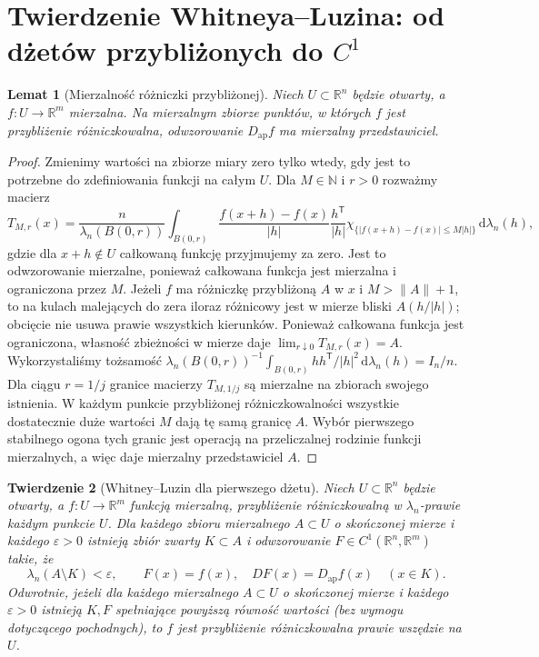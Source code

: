 \documentclass[11pt,a4paper,oneside]{book}
\numberwithin{equation}{chapter}
\theoremstyle{plain}
\newtheorem{twierdzenie}{Twierdzenie}[chapter]
\newtheorem{lemat}[twierdzenie]{Lemat}
\theoremstyle{definition}
\theoremstyle{remark}
\begin{document}
\section{Twierdzenie Whitneya--Luzina: od dżetów przybliżonych do $C^1$}
\begin{lemat}[Mierzalność różniczki przybliżonej]
\label{lem:dzety-ap-meas}
Niech $U\subset\mathbb R^n$ będzie otwarty,
a $f:U\to\mathbb R^m$ mierzalna. Na mierzalnym
zbiorze punktów, w których $f$ jest przybliżenie
różniczkowalna, odwzorowanie $D_{\mathrm{ap}}f$
ma mierzalny przedstawiciel.
\end{lemat}
\begin{proof}
Zmienimy wartości na zbiorze miary zero tylko wtedy,
gdy jest to potrzebne do zdefiniowania funkcji na całym $U$.
Dla $M\in\mathbb N$ i $r>0$ rozważmy macierz
\[
 T_{M,r}(x)=\frac{n}{\lambda_n(B(0,r))}
 \int_{B(0,r)}\frac{f(x+h)-f(x)}{|h|}
 \frac{h^{\mathsf T}}{|h|}
 \chi_{\{|f(x+h)-f(x)|\le M|h|\}}
 \,\mathrm d\lambda_n(h),
\]
gdzie dla $x+h\notin U$ całkowaną funkcję przyjmujemy za zero.
Jest to odwzorowanie mierzalne, ponieważ całkowana funkcja
jest mierzalna i ograniczona przez $M$.
Jeżeli $f$ ma różniczkę przybliżoną $A$ w $x$ i
$M>\|A\|+1$, to na kulach malejących do zera
iloraz różnicowy jest w mierze bliski
$A(h/|h|)$; obcięcie nie usuwa prawie wszystkich
kierunków. Ponieważ całkowana funkcja jest ograniczona,
własność zbieżności w mierze daje
$\lim_{r\downarrow0}T_{M,r}(x)=A$.
Wykorzystaliśmy tożsamość
$\lambda_n(B(0,r))^{-1}\int_{B(0,r)}
 hh^{\mathsf T}/|h|^2\,\mathrm d\lambda_n(h)=I_n/n$.
Dla ciągu $r=1/j$ granice macierzy $T_{M,1/j}$ są
mierzalne na zbiorach swojego istnienia. W każdym punkcie
przybliżonej różniczkowalności wszystkie dostatecznie
duże wartości $M$ dają tę samą granicę $A$.
Wybór pierwszego stabilnego ogona tych granic jest
operacją na przeliczalnej rodzinie funkcji mierzalnych,
a więc daje mierzalny przedstawiciel $A$.
\end{proof}

\begin{twierdzenie}[Whitney--Luzin dla pierwszego dżetu]
\label{thm:dzety-whitney-lusin}
Niech $U\subset\mathbb R^n$ będzie otwarty,
a $f:U\to\mathbb R^m$ funkcją mierzalną,
przybliżenie różniczkowalną w $\lambda_n$-prawie każdym
punkcie $U$. Dla każdego zbioru mierzalnego $A\subset U$
o skończonej mierze i każdego $\varepsilon>0$ istnieją
zbiór zwarty $K\subset A$ i odwzorowanie
$F\in C^1(\mathbb R^n,\mathbb R^m)$ takie, że
\[
 \lambda_n(A\setminus K)<\varepsilon,
 \qquad F(x)=f(x),\quad DF(x)=D_{\mathrm{ap}}f(x)
 \quad (x\in K).
\]
Odwrotnie, jeżeli dla każdego mierzalnego $A\subset U$
o skończonej mierze i każdego $\varepsilon>0$ istnieją
$K,F$ spełniające powyższą równość wartości (bez wymogu
dotyczącego pochodnych), to $f$ jest przybliżenie
różniczkowalna prawie wszędzie na $U$.
\end{twierdzenie}
\end{document}

